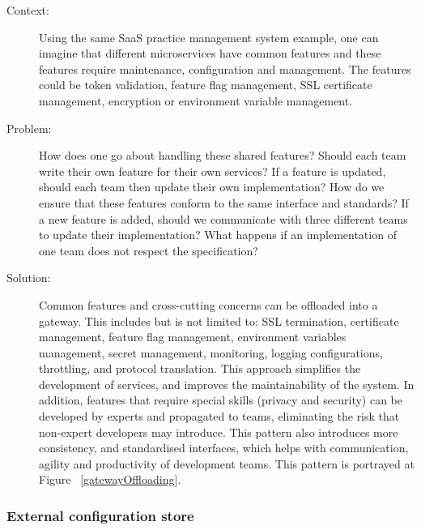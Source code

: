 \documentclass{bmcart}
\begin{document}
\begin{description}
  \item[Context:] Using the same SaaS practice management system example, one can imagine that different microservices have common features and these features require maintenance, configuration and management. The features could be token validation, feature flag management, SSL certificate management, encryption or environment variable management. 
  \item[Problem:] How does one go about handling these shared features? Should each team write their own feature for their own services? If a feature is updated, should each team then update their own implementation? How do we ensure that these features conform to the same interface and standards? If a new feature is added, should we communicate with three different teams to update their implementation? What happens if an implementation of one team does not respect the specification?
  \item[Solution:] Common features and cross-cutting concerns can be offloaded into a gateway. This includes but is not limited to: SSL termination, certificate management, feature flag management, environment variables management, secret management, monitoring, logging configurations, throttling, and protocol translation. This approach simplifies the development of services, and improves the maintainability of the system.  In addition, features that require special skills (privacy and security) can be developed by experts and propagated to teams, eliminating the risk that non-expert developers may introduce. This pattern also introduces more consistency, and standardised interfaces, which helps with communication, agility and productivity of development teams. This pattern is portrayed at Figure ~\ref{gatewayOffloading}.   

\end{description}


\subsubsection{External configuration store}
\end{document}
